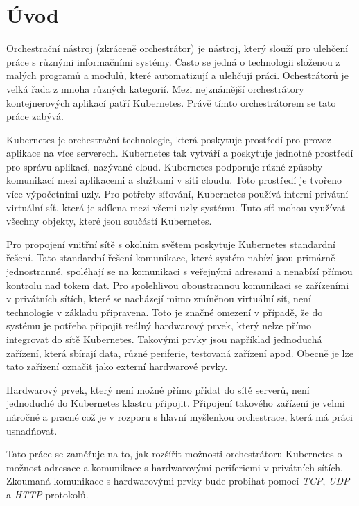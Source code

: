 \chapter*{Úvod}
\setcounter{page}{1}

Orchestrační nástroj (zkráceně orchestrátor) je nástroj, který slouží pro ulehčení práce s různými informačními systémy. Často se jedná o technologii složenou z malých programů a modulů, které automatizují a ulehčují práci. Ochestrátorů je velká řada z mnoha různých kategorií. Mezi nejznámější orchestrátory kontejnerových aplikací patří Kubernetes. Právě tímto orchestrátorem se tato práce zabývá. \cite{goldberg_2019_workflow}

Kubernetes je orchestrační technologie, která poskytuje prostředí pro provoz aplikace na více serverech. Kubernetes tak vytváří a poskytuje jednotné prostředí pro správu aplikací, nazývané cloud. Kubernetes podporuje různé způsoby komunikací mezi aplikacemi a službami v síti cloudu. Toto prostředí je tvořeno více výpočetními uzly. Pro potřeby síťování, Kubernetes používá interní privátní virtuální síť, která je sdílena mezi všemi uzly systému. Tuto síť mohou využívat všechny objekty, které jsou součástí Kubernetes.

Pro propojení vnitřní sítě s okolním světem poskytuje Kubernetes standardní řešení. Tato standardní řešení komunikace, které systém nabízí jsou primárně jednostranné, spoléhají se na komunikaci s veřejnými adresami a nenabízí přímou kontrolu nad tokem dat. Pro spolehlivou oboustrannou komunikaci se zařízeními v privátních sítích, které se nacházejí mimo zmíněnou virtuální síť, není technologie v základu připravena. Toto je značné omezení v případě, že do systému je potřeba připojit reálný hardwarový prvek, který nelze přímo integrovat do sítě Kubernetes. Takovými prvky jsou například jednoduchá zařízení, která sbírají data, různé periferie, testovaná zařízení apod. Obecně je lze tato zařízení označit jako externí hardwarové prvky.

Hardwarový prvek, který není možné přímo přidat do sítě serverů, není jednoduché do Kubernetes klastru připojit. Připojení takového zařízení je velmi náročné a pracné což je v rozporu s hlavní myšlenkou orchestrace, která má práci usnadňovat.

Tato práce se zaměřuje na to, jak rozšířit možnosti orchestrátoru Kubernetes o možnost adresace a komunikace s hardwarovými periferiemi v privátních sítích. Zkoumaná komunikace s hardwarovými prvky bude probíhat pomocí \textit{TCP}, \textit{UDP} a \textit{HTTP} protokolů.

